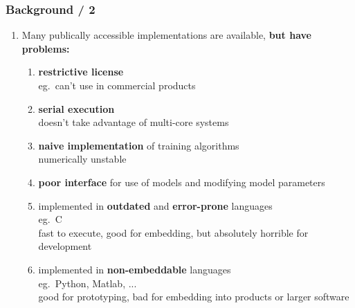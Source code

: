 \documentclass[usenames,dvipsnames]{beamer}
\begin{document}
%
%
%

\begin{frame}
\frametitle{Background / 2}

\begin{enumerate}[{~~$\boldsymbol{\bullet}$}]

\item Many publically accessible implementations are available, {\bf but have problems:}

\begin{enumerate}[{$\boldsymbol{\rightarrow}$}]
\renewcommand{\itemsep}{0.9ex}
\item 
{\bf restrictive license}\\
eg.~can't use in commercial products

\item
{\bf serial execution}\\
doesn't take advantage of multi-core systems

\item
{\bf naive implementation} of training algorithms\\
numerically unstable

\item
{\bf poor interface} for use of models and modifying model parameters

\item
implemented in {\bf outdated} and {\bf error-prone} languages\\
eg.~C\\
fast to execute, good for embedding, but absolutely horrible for development

\item
implemented in {\bf non-embeddable} languages\\
eg.~Python, Matlab, ...\\
good for prototyping, bad for embedding into products or larger software

\end{enumerate}

\end{enumerate}
\end{frame}

%
%
%
\end{document}
